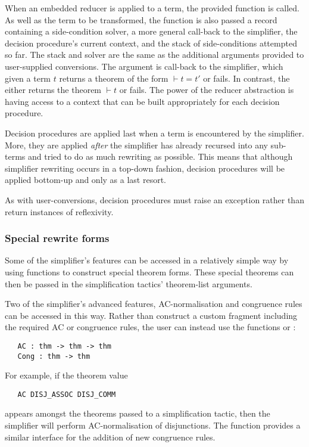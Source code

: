 When an embedded reducer is applied to a term, the provided 
function is called.  As well as the term to be transformed, the
 function is also passed a record containing a
side-condition solver, a more general call-back to the simplifier, 
the decision procedure's current context, and the
stack of side-conditions attempted so far.  The stack and solver are
the same as the additional arguments provided to user-supplied
conversions. The  argument is call-back to the simplifier,
which given a term $t$ returns a theorem of the form $\vdash t = t'$
or fails. In contrast, the  either returns the theorem
$\vdash t$ or fails. The power of the reducer abstraction is having
access to a context that can be built appropriately for each decision
procedure.

Decision procedures are applied last when a term is encountered by the
simplifier.  More, they are applied \emph{after} the simplifier has
already recursed into any sub-terms and tried to do as much rewriting
as possible.  This means that although simplifier rewriting occurs in
a top-down fashion, decision procedures will be applied bottom-up and
only as a last resort.

As with user-conversions, decision procedures must raise an exception
rather than return instances of reflexivity.

\subsubsection{Special rewrite forms}
\label{sec:simp-special-rewrite-forms}

Some of the simplifier's features can be accessed in a relatively
simple way by using \ML{} functions to construct special theorem
forms.  These special theorems can then be passed in the
simplification tactics' theorem-list arguments.

Two of the simplifier's advanced features, AC-normalisation and
congruence rules can be accessed in this way.  Rather than construct a
custom \simpset{} fragment including the required AC or congruence
rules, the user can instead use the functions  or :
\begin{hol}
\begin{verbatim}
   AC : thm -> thm -> thm
   Cong : thm -> thm
\end{verbatim}
\end{hol}
For example, if the theorem value
\begin{hol}
\begin{verbatim}
   AC DISJ_ASSOC DISJ_COMM
\end{verbatim}
\end{hol}
appears amongst the theorems passed to a simplification tactic, then
the simplifier will perform AC-normalisation of disjunctions.  The
 function provides a similar interface for the addition of
new congruence rules.

